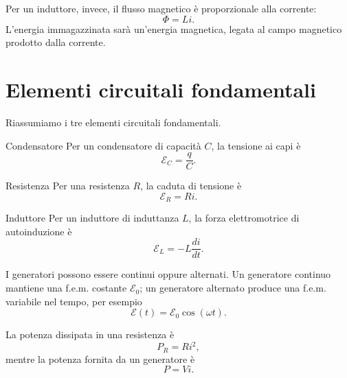 \documentclass[a4paper]{article}
\begin{document}
Per un induttore, invece, il flusso magnetico è proporzionale alla corrente:
\[
\Phi=Li.
\]
L'energia immagazzinata sarà un'energia magnetica, legata al campo magnetico prodotto dalla corrente.

\section{Elementi circuitali fondamentali}

Riassumiamo i tre elementi circuitali fondamentali.

\begin{snippetdefinition}{Condensatore}
Per un condensatore di capacità \(C\), la tensione ai capi è
\[
    \mathcal{E}_C=\frac{q}{C}.
\]
\end{snippetdefinition}

\begin{snippetdefinition}{Resistenza}
Per una resistenza \(R\), la caduta di tensione è
\[
    \mathcal{E}_R=Ri.
\]
\end{snippetdefinition}

\begin{snippetdefinition}{Induttore}
Per un induttore di induttanza \(L\), la forza elettromotrice di autoinduzione è
\[
    \mathcal{E}_L=-L\frac{di}{dt}.
\]
\end{snippetdefinition}

\begin{center}
\end{center}

I generatori possono essere continui oppure alternati. Un generatore continuo mantiene una f.e.m. costante \(\mathcal{E}_0\); un generatore alternato produce una f.e.m. variabile nel tempo, per esempio
\[
\mathcal{E}(t)=\mathcal{E}_0\cos(\omega t).
\]

La potenza dissipata in una resistenza è
\[
P_R=Ri^2,
\]
mentre la potenza fornita da un generatore è
\[
P=Vi.
\]
\end{document}
